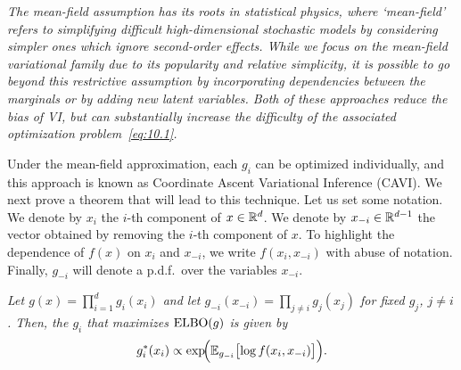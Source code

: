 \begin{remark}
  \label{rem:10.6}
  \textit{The mean-field assumption has its roots in statistical physics, where `mean-field' refers
  to simplifying difficult high-dimensional stochastic models by considering simpler ones which ignore
  second-order effects. While we focus on the mean-field variational family due to its popularity and
  relative simplicity, it is possible to go beyond this restrictive assumption by incorporating
  dependencies between the marginals or by adding new latent variables. Both of these approaches
  reduce the bias of VI, but can substantially increase the difficulty of the associated optimization
  problem~\eqref{eq:10.1}.}
\end{remark}

Under the mean-field approximation, each $g_i$ can be optimized individually, and this approach is
known as Coordinate Ascent Variational Inference (CAVI). We next prove a theorem that will lead to
this technique. Let us set some notation. We denote by $x_i$ the $i$-th component of
$x \in \mathbb{R}^d$. We denote by $x_{-i} \in \mathbb{R}^{d-1}$ the vector obtained by removing the $i$-th
component of $x$. To highlight the dependence of $f(x)$ on $x_i$ and $x_{-i}$, we write
$f(x_i, x_{-i})$ with abuse of notation. Finally, $g_{-i}$ will denote a p.d.f.\ over the variables
$x_{-i}$.

\begin{theorem}
  \label{thm:10.7}
  \textit{Let $g(x) = \prod_{i=1}^d g_i(x_i)$ and let $g_{-i}(x_{-i}) = \prod_{j \neq i} g_j(x_j)$
  for fixed $g_j$, $j \neq i$. Then, the $g_i$ that maximizes $\mathrm{ELBO}(g)$ is given by}
  \begin{equation}
    g_i^*(x_i) \propto \exp\!\Bigl(\mathbb{E}_{g_{-i}}\bigl[\log f(x_i, x_{-i})\bigr]\Bigr).
    \label{eq:10.2}
  \end{equation}
\end{theorem}

